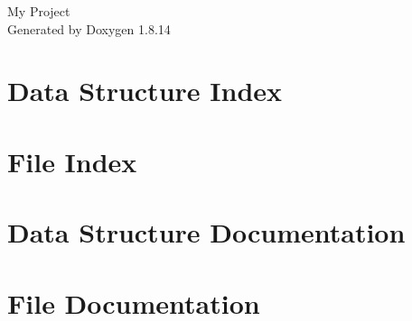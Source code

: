 \documentclass[twoside]{book}
\newcommand{\+}{\discretionary{\mbox{\scriptsize$\hookleftarrow$}}{}{}}
\newcommand{\clearemptydoublepage}{%
  \newpage{\pagestyle{empty}\cleardoublepage}%
}
\begin{document}
\hypersetup{pageanchor=false,
             bookmarksnumbered=true,
             pdfencoding=unicode
            }
\begin{titlepage}
\vspace*{7cm}
\begin{center}%
{\Large My Project }\\
\vspace*{1cm}
{\large Generated by Doxygen 1.8.14}\\
\end{center}
\end{titlepage}
\clearemptydoublepage
{}
\tableofcontents
\clearemptydoublepage
{}
\hypersetup{pageanchor=true}

\chapter{Data Structure Index}

\chapter{File Index}

\chapter{Data Structure Documentation}























\chapter{File Documentation}



































\backmatter
\newpage
{}
\clearemptydoublepage
{}
\printindex
\end{document}
